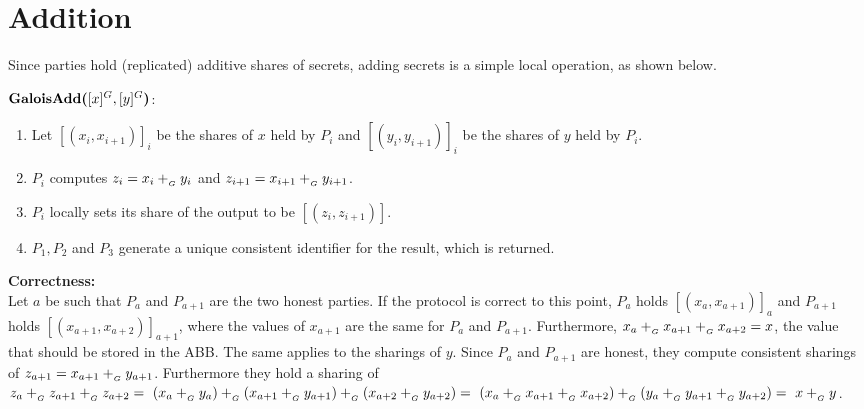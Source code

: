 \section{Addition}

Since parties hold (replicated) additive shares of secrets,
adding secrets is a simple local operation, as shown below.

\begin{protocol}
	$\textbf{GaloisAdd(}[x]^{G}, [y]^{G}\textbf{)}$:
	\begin{enumerate}
		\item Let $[(x_i, x_{i+1})]_i$ be the shares of $x$ held by $P_i$
			and $[(y_i, y_{i+1})]_i$ be the shares of $y$ held by $P_i$.
		\item $P_i$ computes $z_i = x_i +_{_G} y_i$ and 
			$z_{i+1} = x_{i+1} +_{_G} y_{i+1}$.
		\item $P_i$ locally sets its share of the output to be $[(z_i, z_{i+1})]$.
		\item $P_1, P_2$ and $P_3$ generate a unique consistent identifier
			for the result, which is returned.
	\end{enumerate}
\end{protocol}

\textbf{Correctness:} \\
Let $a$ be such that $P_a$ and $P_{a+1}$ are the two honest parties.
If the protocol is correct to this point, $P_a$ holds $[(x_a, x_{a+1})]_a$
and $P_{a+1}$ holds $[(x_{a+1}, x_{a+2})]_{a+1}$,
where the values of $x_{a+1}$ are the same for $P_a$ and $P_{a+1}$.
Furthermore, $x_{a} +_{_G} x_{a+1} +_{_G} x_{a+2} = x$, the value that should be
stored in the ABB.
The same applies to the sharings of $y$.
Since $P_{a}$ and $P_{a+1}$ are honest, they compute consistent sharings
of $z_{a+1} = x_{a+1} +_{_G} y_{a+1}$. 
Furthermore they hold a sharing of 
$z_a +_{_G} z_{a+1} +_{_G} z_{a+2} = \
(x_a +_{_G} y_a) +_{_G} (x_{a+1} +_{_G} y_{a+1}) +_{_G} (x_{a+2} +_{_G} y_{a+2}) = \
(x_a +_{_G} x_{a+1} +_{_G} x_{a+2}) +_{_G} (y_a +_{_G} y_{a+1} +_{_G} y_{a+2}) = \
x +_{_G} y$.



